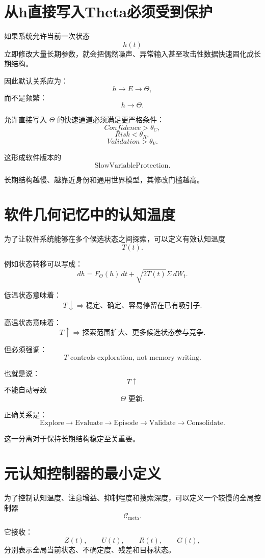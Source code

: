\section{从h直接写入Theta必须受到保护}

如果系统允许当前一次状态
\[
h(t)
\]
立即修改大量长期参数，就会把偶然噪声、异常输入甚至攻击性数据快速固化成长期结构。

因此默认关系应为：
\[
\boxed{
h
\rightarrow
E
\rightarrow
\Theta,
}
\]
而不是频繁：
\[
h\rightarrow\Theta.
\]

允许直接写入 $\Theta$ 的快速通道必须满足更严格条件：
\[
Confidence>\theta_C,
\]
\[
Risk<\theta_R,
\]
\[
Validation>\theta_V.
\]

这形成软件版本的
\[
\boxed{
\mathrm{SlowVariableProtection}.
}
\]

长期结构越慢、越靠近身份和通用世界模型，其修改门槛越高。

\section{软件几何记忆中的认知温度}

为了让软件系统能够在多个候选状态之间探索，可以定义有效认知温度
\[
T(t).
\]

例如状态转移可以写成：
\[
dh
=
F_\Theta(h)\,dt
+
\sqrt{2T(t)}
\Sigma\,dW_t.
\]

低温状态意味着：
\[
T\downarrow
\Rightarrow
\text{稳定、确定、容易停留在已有吸引子}.
\]

高温状态意味着：
\[
T\uparrow
\Rightarrow
\text{探索范围扩大、更多候选状态参与竞争}.
\]

但必须强调：
\[
\boxed{
T
\text{ controls exploration, not memory writing}.
}
\]

也就是说：
\[
T\uparrow
\]
不能自动导致
\[
\Theta\text{ 更新}.
\]

正确关系是：
\[
\boxed{
\mathrm{Explore}
\rightarrow
\mathrm{Evaluate}
\rightarrow
\mathrm{Episode}
\rightarrow
\mathrm{Validate}
\rightarrow
\mathrm{Consolidate}.
}
\]

这一分离对于保持长期结构稳定至关重要。

\section{元认知控制器的最小定义}

为了控制认知温度、注意增益、抑制程度和搜索深度，可以定义一个较慢的全局控制器
\[
\boxed{
\mathcal C_{\mathrm{meta}}.
}
\]

它接收：
\[
Z(t),
\qquad
U(t),
\qquad
R(t),
\qquad
G(t),
\]
分别表示全局当前状态、不确定度、残差和目标状态。

